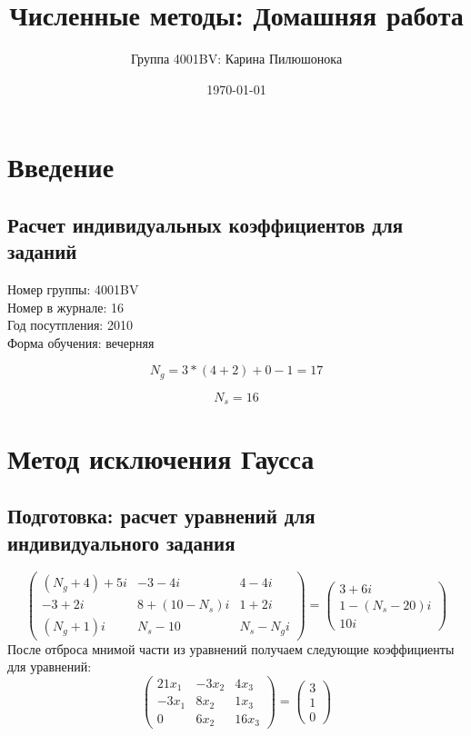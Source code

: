 \documentclass{article}
\title{Численные методы: Домашняя работа}
\author{Группа 4001BV: Карина Пилюшонока}
\date \today
\begin{document}
\maketitle
\newpage
\tableofcontents
\newpage
\section{Введение}
\subsection{Расчет индивидуальных коэффициентов для заданий}
Номер группы: 4001BV \\
Номер в журнале: 16 \\
Год посутпления: 2010 \\
Форма обучения: вечерняя


\begin{displaymath} 
  N_{g} = 3 * (4 + 2) + 0 - 1 = 17
\end{displaymath}

\begin{displaymath}
  N_{s} = 16
\end{displaymath}
\section{Метод исключения Гаусса}
\subsection{Подготовка: расчет уравнений для индивидуального задания}
\begin{displaymath}
\left(
  \begin{array}{ccc}
    (N_{g}+4)+5i & -3-4i & 4-4i \\
    -3+2i & 8+(10-N_{s})i & 1+2i \\
    (N_{g}+1)i & N_{s}-10 & N_{s}-N_{g}i
  \end{array}
\right)
=
\left(
  \begin{array}{ccc}
    3+6i\\
    1-(N_{s}-20)i\\
    10i
  \end{array}
\right)
\end{displaymath}
После отброса мнимой части из уравнений получаем следующие коэффициенты для
уравнений:
\begin{displaymath}
\left(
  \begin{array}{ccc}
    21 x_{1} & -3 x_{2} & 4 x_{3} \\
    -3 x_{1} & 8 x_{2} & 1 x_{3} \\
    0 & 6 x_{2} & 16 x_{3}
  \end{array}
\right)
=
\left(
  \begin{array}{ccc}
    3\\
    1\\
    0
  \end{array}
\right)
\end{displaymath}
\end{document}
